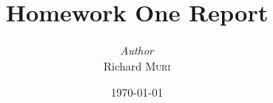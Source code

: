 \documentclass[a4paper, 12pt]{report}
\institute{Massachusetts Institute of Technology}
\title{Homework One Report}
\author{\textit{Author}\\Richard \textsc{Muri}}
\date{\today}
\begin{document}
    \maketitle
    \romantableofcontents
    

    
    
\end{document}
